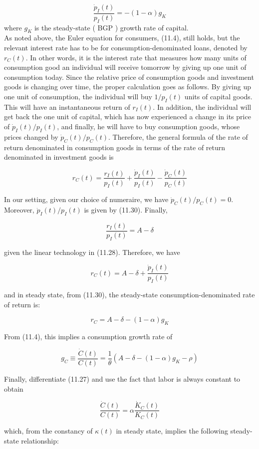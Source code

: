 \documentclass[\topdir/lecture\_notes.tex]{subfiles}
\begin{document}
\[
\frac{\dot{p}_{I}(t)}{p_{I}(t)}=-(1-\alpha) g_{K}
\]
 where $g_K$ is the steady-state ( BGP ) growth rate of capital.\\
As noted above, the Euler equation for consumers, (11.4), still holds, but the relevant interest rate has to be for consumption-denominated loans, denoted by $r_C(t)$. In other words, it is the interest rate that measures how many units of consumption good an individual will receive tomorrow by giving up one unit of consumption today. Since the relative price of consumption goods and investment goods is changing over time, the proper calculation goes as follows. By giving up one unit of consumption, the individual will buy $1 / p_{I}(t)$ units of capital goods. This will have an instantaneous return of $r_{I}(t)$. In addition, the individual will get back the one unit of capital, which has now experienced a change in its price of $\dot{p}_{I}(t) / p_{I}(t)$, and finally, he will have to buy consumption goods, whose prices changed by $\dot{p}_{C}(t) / p_{C}(t)$. Therefore, the general formula of the rate of return denominated in consumption goods in terms of the rate of return denominated in investment goods is

\[
r_{C}(t)=\frac{r_{I}(t)}{p_{I}(t)}+\frac{\dot{p}_{I}(t)}{p_{I}(t)}-\frac{\dot{p}_{C}(t)}{p_{C}(t)}
\]

In our setting, given our choice of numeraire, we have $\dot{p}_{C}(t) / p_{C}(t)=0$. Moreover, $\dot{p}_{I}(t) / p_{I}(t)$ is given by (11.30). Finally,

\[
\frac{r_{I}(t)}{p_{I}(t)}=A-\delta
\]

given the linear technology in (11.28). Therefore, we have

\[
r_{C}(t)=A-\delta+\frac{\dot{p}_{I}(t)}{p_{I}(t)}
\]

and in steady state, from (11.30), the steady-state consumption-denominated rate of return is:

\[
r_{C}=A-\delta-(1-\alpha) g_{K}
\]

From (11.4), this implies a consumption growth rate of

\[
g_{C} \equiv \frac{\dot{C}(t)}{C(t)}=\frac{1}{\theta}\left(A-\delta-(1-\alpha) g_{K}-\rho\right)
\]

Finally, differentiate (11.27) and use the fact that labor is always constant to obtain

\[
\frac{\dot{C}(t)}{C(t)}=\alpha \frac{\dot{K}_{C}(t)}{K_{C}(t)}
\]

which, from the constancy of $\kappa(t)$ in steady state, implies the following steady-state relationship:
\end{document}
